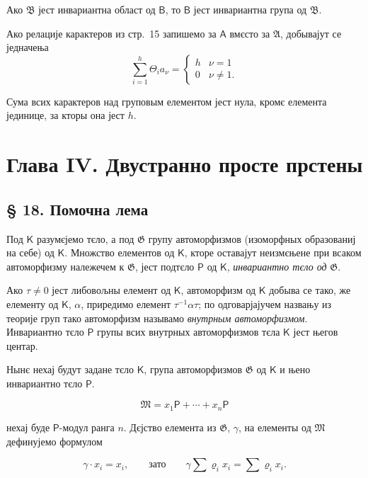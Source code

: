 \documentclass[11pt]{article}
\begin{document}
Ако \(\mathfrak B\) јест инвариантна област од \(\mathsf B\), то \(\mathsf B\) јест инвариантна група од \(\mathfrak B\).

Ако релације карактеров из стр.~15 запишемо за \(\mathsf A\) вмєсто за \(\mathfrak A\), добывајут се једначења
\[
\sum_{i=1}^{h} \Theta_i a_\nu =
\begin{cases}
h & \nu=1\\
0 & \nu\ne 1.
\end{cases}
\]

Сума всих карактеров над груповым елементом јест нула, кромє елемента јединице, за кторы она јест \(h\).

\section*{Глава IV. Двустранно просте прстены}\label{kapitel-iv.-zweiseitig-einfache-ringe}

\subsection*{§ 18. Помочна лема}\label{ein-hilfssatz}

Под \(\mathsf K\) разумєјемо тєло, а под \(\mathfrak G\) групу автоморфизмов (изоморфных образованиј на себе) од \(\mathsf K\). Множство елементов од \(\mathsf K\), кторе оставајут неизмєњене при всаком автоморфизму належечем к \(\mathfrak G\), јест подтєло \(\mathsf P\) од \(\mathsf K\), \emph{инвариантно тєло од} \(\mathfrak G\).

Ако \(\tau\ne 0\) јест либовољны елемент од \(\mathsf K\), автоморфизм од \(\mathsf K\) добыва се тако, же елементу од \(\mathsf K\), \(\alpha\), приредимо елемент \(\tau^{-1}\alpha\tau\); по одговарјајучем назвању из теорије груп тако автоморфизм называмо \emph{внутрным автоморфизмом}. Инвариантно тєло \(\mathsf P\) групы всих внутрных автоморфизмов тєла \(\mathsf K\) јест његов центар.

Нынє нехај будут задане тєло \(\mathsf K\), група автоморфизмов \(\mathfrak G\) од \(\mathsf K\) и њено инвариантно тєло \(\mathsf P\).

\[
\mathfrak M=x_1\mathsf P+\cdots+x_n\mathsf P
\]

нехај буде \(\mathsf P\)-модул ранга \(n\). Дєјство елемента из \(\mathfrak G\), \(\gamma\), на елементы од \(\mathfrak M\) дефинујемо формулом

\[
\gamma\cdot x_i=x_i,\qquad\text{зато}\qquad
\gamma\sum \varrho_i x_i=\sum \varrho_i x_i.
\]
\end{document}
